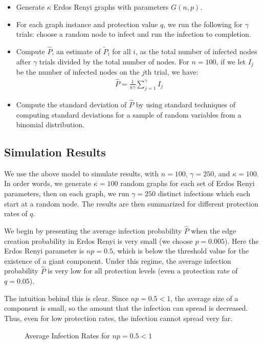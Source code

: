 \documentclass{article}
\theoremstyle{plain}
\begin{document}
\begin{itemize}
  \item Generate $\kappa$ Erdos Renyi graphs with parameters $G(n, p)$.
  \item For each graph instance and protection value $q$, we run the following for $\gamma$ trials: choose a random node to infect and run the infection to completion.
  \item Compute $\hat{P}$, an estimate of $\tilde{P}_i$ for all $i$, as the total number of infected nodes after $\gamma$ trials divided by the total number of nodes. For $n = 100$, if we let $I_j$ be the number of infected nodes on the $j$th trial, we have:
    \begin{eqnarray}
      \hat{P} = \frac{1}{n \gamma} \sum_{j=1}^{\gamma} I_j
    \end{eqnarray}
  \item Compute the standard deviation of $\hat{P}$ by using standard techniques of computing standard deviations for a sample of random variables from a binomial distribution.
\end{itemize}

\subsection{Simulation Results}

We use the above model to simulate results, with $n = 100$, $\gamma = 250$, and $\kappa = 100$. In order words, we generate $\kappa = 100$ random graphs for each set of Erdos Renyi parameters, then on each graph, we run $\gamma = 250$ distinct infections which each start at a random node. The results are then summarized for different protection rates of $q$.

We begin by presenting the average infection probability $\hat{P}$ when the edge creation probability in Erdos Renyi is very small (we choose $p = 0.005$). Here the Erdos Renyi parameter is $np = 0.5$, which is below the threshold value for the existence of a giant component. Under this regime, the average infection probability $\hat{P}$ is very low for all protection levels (even a protection rate of $q = 0.05$).

The intuition behind this is clear. Since $np = 0.5 < 1$, the average size of a component is small, so the amount that the infection can spread is decreased. Thus, even for low protection rates, the infection cannot spread very far.

\begin{figure}
  \caption{Average Infection Rates for $np = 0.5 < 1$}
\end{figure}
\end{document}
